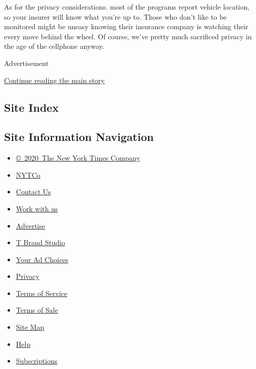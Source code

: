 As for the privacy considerations. most of the programs report vehicle
location, so your insurer will know what you're up to. Those who don't
like to be monitored might be uneasy knowing their insurance company is
watching their every move behind the wheel. Of course, we've pretty much
sacrificed privacy in the age of the cellphone anyway.

Advertisement

\protect\hyperlink{after-bottom}{Continue reading the main story}

\hypertarget{site-index}{%
\subsection{Site Index}\label{site-index}}

\hypertarget{site-information-navigation}{%
\subsection{Site Information
Navigation}\label{site-information-navigation}}

\begin{itemize}
\tightlist
\item
  \href{https://help.nytimes3xbfgragh.onion/hc/en-us/articles/115014792127-Copyright-notice}{©~2020~The
  New York Times Company}
\end{itemize}

\begin{itemize}
\tightlist
\item
  \href{https://www.nytco.com/}{NYTCo}
\item
  \href{https://help.nytimes3xbfgragh.onion/hc/en-us/articles/115015385887-Contact-Us}{Contact
  Us}
\item
  \href{https://www.nytco.com/careers/}{Work with us}
\item
  \href{https://nytmediakit.com/}{Advertise}
\item
  \href{http://www.tbrandstudio.com/}{T Brand Studio}
\item
  \href{https://www.nytimes3xbfgragh.onion/privacy/cookie-policy\#how-do-i-manage-trackers}{Your
  Ad Choices}
\item
  \href{https://www.nytimes3xbfgragh.onion/privacy}{Privacy}
\item
  \href{https://help.nytimes3xbfgragh.onion/hc/en-us/articles/115014893428-Terms-of-service}{Terms
  of Service}
\item
  \href{https://help.nytimes3xbfgragh.onion/hc/en-us/articles/115014893968-Terms-of-sale}{Terms
  of Sale}
\item
  \href{https://spiderbites.nytimes3xbfgragh.onion}{Site Map}
\item
  \href{https://help.nytimes3xbfgragh.onion/hc/en-us}{Help}
\item
  \href{https://www.nytimes3xbfgragh.onion/subscription?campaignId=37WXW}{Subscriptions}
\end{itemize}

